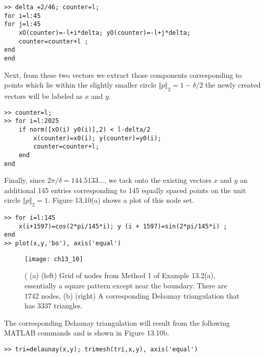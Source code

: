 \documentclass[../main.tex]{subfiles}
\begin{document}
\begin{lstlisting}[numbers=none,frame=none]
>> delta =2/46; counter=l; 
for i=l:45 
for j=l:45 
	xO(counter)=-l+i*delta; yO(counter)=-l+j*delta; 
	counter=counter+l ; 
end 
end 
\end{lstlisting}
Next, from these two vectors we extract those components corresponding to points 
which lie within the slightly smaller circle $\Vert p \Vert_2=1-\delta /2$ the newly created vectors will be labeled as $x$ and $y$. 

\begin{lstlisting}[numbers=none,frame=none]
>> counter=l; 
>> for i=l:2025 
	if norm([xO(i) y0(i)],2) < l-delta/2 
		x(counter)=x0(i); y(counter)=y0(i); 
		counter=counter+l; 
	end 
end 
\end{lstlisting}
Finally, since $2\pi/ \delta = 144.5133...$, we tack onto the existing vectors $x$ and $y$ an additional 145 entries corresponding to 145 equally spaced points on the unit circle $\Vert p \Vert_2 =1$. Figure 13.10(a) shows a plot of this node set. 

\begin{lstlisting}[numbers=none,frame=none]
>> for i=l:145 
	x(i+1597)=cos(2*pi/145*i); y (i + 1597)=sin(2*pi/145*i) ; 
end 
>> plot(x,y,'bo'), axis('equal') 
\end{lstlisting}

\begin{figure}[H]
	\centering
	\texttt{[image: ch13\_10]}
	\caption{\textsf{( (a) (left) Grid of nodes from Method 1 of Example 13.2(a), essentially a square pattern except near the boundary. There are 1742 nodes, (b) (right) A corresponding Delaunay triangulation that has 3337 triangles.}}
	\label{pfig:ch13_10}
\end{figure}

The corresponding Delaunay triangulation will result from the following MATLAB commands and is shown in Figure 13.10b. 

\begin{lstlisting}[numbers=none,frame=none]
>> tri=delaunay(x,y); trimesh(tri,x,y), axis('equal')
\end{lstlisting}
\end{document}
